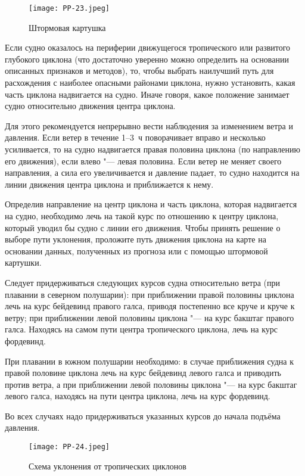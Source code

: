 \begin{figure}[htb]
  \centering{}
  \texttt{[image: PP-23.jpeg]}
  \caption{Штормовая картушка}
  \label{fig:pp23}
  \small
  \centering{}
\end{figure}

Если судно оказалось на периферии движущегося тропического или
развитого глубокого циклона (что достаточно уверенно можно определить
на основании описанных признаков и методов), то, чтобы выбрать
наилучший путь для расхождения с наиболее опасными районами циклона,
нужно установить, какая часть циклона надвигается на судно. Иначе
говоря, какое положение занимает судно относительно движения центра
циклона.

Для этого рекомендуется непрерывно вести наблюдения за изменением
ветра и давления. Если ветер в течение 1--3~ч поворачивает вправо и
несколько усиливается, то на судно надвигается правая половина циклона
(по направлению его движения), если влево "--- левая половина. Если ветер
не меняет своего направления, а сила его увеличивается и давление
падает, то судно находится на линии движения центра циклона и
приближается к нему.

Определив направление на центр циклона и часть циклона, которая
надвигается на судно, необходимо лечь на такой курс по отношению к
центру циклона, который уводил бы судно с линии его движения. Чтобы
принять решение о выборе пути уклонения, проложите путь движения
циклона на карте на основании данных, полученных из прогноза или с
помощью штормовой картушки.

Следует придерживаться следующих курсов судна относительно ветра (при
плавании в северном полушарии): при приближении правой половины
циклона лечь на курс бейдевинд правого галса, приводя постепенно все
круче и круче к ветру; при приближении левой половины циклона "--- на курс
бакштаг правого галса. Находясь на самом пути центра тропического
циклона, лечь на курс фордевинд.

При плавании в южном полушарии необходимо: в случае приближения судна
к правой половине циклона лечь на курс бейдевинд левого галса и
приводить против ветра, а при приближении левой половины циклона "---
на курс бакштаг левого галса, находясь на пути центра циклона, лечь на
курс фордевинд.

Во всех случаях надо придерживаться указанных курсов до начала подъёма
давления.

\begin{figure}[htb]
  \centering{}
  \texttt{[image: PP-24.jpeg]}
  \caption{Схема уклонения от тропических циклонов}
  \label{fig:pp24}
  \small
  \centering{}
\end{figure}

